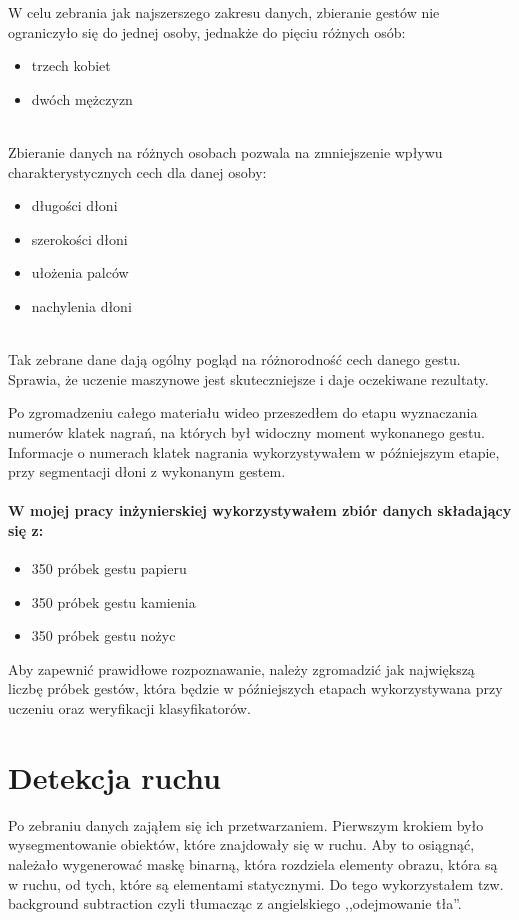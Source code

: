 \documentclass[a4paper,12pt,twoside,openany]{report}
\begin{document}
W celu zebrania jak najszerszego zakresu danych, zbieranie gestów nie ograniczyło się do jednej osoby, jednakże do pięciu różnych osób:
\begin{itemize}
	\item trzech kobiet
	\item dwóch mężczyzn
\end{itemize}
\mbox{} \\
\indent 
Zbieranie danych na różnych osobach pozwala na zmniejszenie wpływu charakterystycznych cech dla danej osoby:
\begin{itemize}
	\item długości dłoni
	\item szerokości dłoni
	\item ułożenia palców
	\item nachylenia dłoni
\end{itemize}
\mbox{} \\
\indent
Tak zebrane dane dają ogólny pogląd na różnorodność cech danego gestu. Sprawia, że uczenie maszynowe jest skuteczniejsze i daje oczekiwane rezultaty. 

Po zgromadzeniu całego materiału wideo przeszedłem do etapu wyznaczania numerów klatek nagrań, na których był widoczny moment wykonanego gestu. Informacje o numerach klatek nagrania wykorzystywałem w późniejszym etapie, przy segmentacji dłoni z wykonanym gestem.

\paragraph{W mojej pracy inżynierskiej wykorzystywałem zbiór danych składający się z:}
\begin{itemize}
	\item 350 próbek gestu papieru
	\item 350 próbek gestu kamienia
	\item 350 próbek gestu nożyc
\end{itemize}

Aby zapewnić prawidłowe rozpoznawanie, należy zgromadzić jak największą liczbę próbek gestów, która będzie w późniejszych etapach wykorzystywana przy uczeniu oraz weryfikacji klasyfikatorów.

\section{Detekcja ruchu}
Po zebraniu danych zająłem się ich przetwarzaniem. Pierwszym krokiem było wysegmentowanie obiektów, które znajdowały się w ruchu. Aby to osiągnąć, należało wygenerować maskę binarną, która rozdziela elementy obrazu, która są w ruchu, od tych, które są elementami statycznymi. Do tego wykorzystałem tzw. background subtraction czyli tłumacząc z angielskiego ,,odejmowanie tła''.
\end{document}
